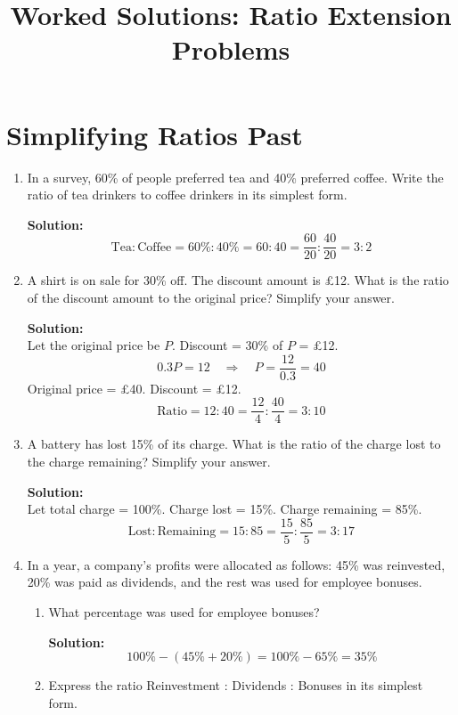 \documentclass[12pt,a4paper]{article}
\title{Worked Solutions: Ratio Extension Problems}
\date{}
\begin{document}
\maketitle

\section*{Simplifying Ratios Past}

\begin{enumerate}
\item In a survey, 60\% of people preferred tea and 40\% preferred coffee. Write the ratio of tea drinkers to coffee drinkers in its simplest form.

\textbf{Solution:}
\[
\text{Tea} : \text{Coffee} = 60\% : 40\% = 60:40 = \frac{60}{20}:\frac{40}{20} = 3:2
\]

\item A shirt is on sale for 30\% off. The discount amount is £12. What is the ratio of the discount amount to the original price? Simplify your answer.

\textbf{Solution:}\\
Let the original price be \( P \). Discount = 30\% of \( P \) = £12.
\[
0.3P = 12 \quad\Rightarrow\quad P = \frac{12}{0.3} = 40
\]
Original price = £40. Discount = £12.
\[
\text{Ratio} = 12:40 = \frac{12}{4}:\frac{40}{4} = 3:10
\]

\item A battery has lost 15\% of its charge. What is the ratio of the charge lost to the charge remaining? Simplify your answer.

\textbf{Solution:}\\
Let total charge = 100\%. Charge lost = 15\%. Charge remaining = 85\%.
\[
\text{Lost} : \text{Remaining} = 15:85 = \frac{15}{5}:\frac{85}{5} = 3:17
\]

\item In a year, a company's profits were allocated as follows: 45\% was reinvested, 20\% was paid as dividends, and the rest was used for employee bonuses.
    \begin{enumerate}
    \item What percentage was used for employee bonuses?
    
    \textbf{Solution:}
    \[
    100\% - (45\% + 20\%) = 100\% - 65\% = 35\%
    \]
    
    \item Express the ratio Reinvestment : Dividends : Bonuses in its simplest form.
    

\end{enumerate}
\end{enumerate}
\end{document}
